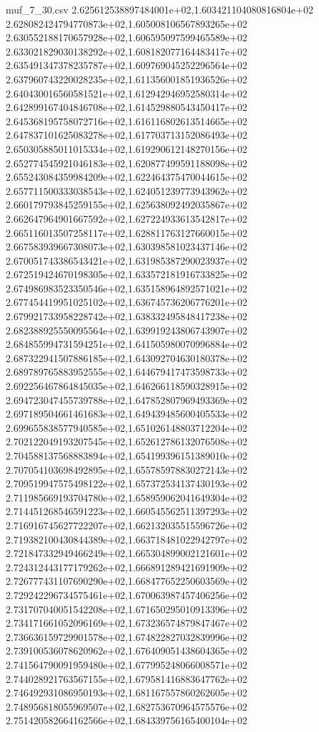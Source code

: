 \begin{filecontents*}{muf_7_30.csv}
2.625612538897484001e+02,1.603421104080816804e+02
2.628082424794770873e+02,1.605008106567893265e+02
2.630552188170657928e+02,1.606595097599465589e+02
2.633021829030138292e+02,1.608182077164483417e+02
2.635491347378235787e+02,1.609769045252296564e+02
2.637960743220028235e+02,1.611356001851936526e+02
2.640430016560581521e+02,1.612942946952580314e+02
2.642899167404846708e+02,1.614529880543450417e+02
2.645368195758072716e+02,1.616116802613514665e+02
2.647837101625083278e+02,1.617703713152086493e+02
2.650305885011015334e+02,1.619290612148270156e+02
2.652774545921046183e+02,1.620877499591188098e+02
2.655243084359984209e+02,1.622464375470044615e+02
2.657711500333038543e+02,1.624051239773943962e+02
2.660179793845259155e+02,1.625638092492035867e+02
2.662647964901667592e+02,1.627224933613542817e+02
2.665116013507258117e+02,1.628811763127660015e+02
2.667583939667308073e+02,1.630398581023437146e+02
2.670051743386543421e+02,1.631985387290023937e+02
2.672519424670198305e+02,1.633572181916733825e+02
2.674986983523350546e+02,1.635158964892571021e+02
2.677454419951025102e+02,1.636745736206776201e+02
2.679921733958228742e+02,1.638332495848417238e+02
2.682388925550095564e+02,1.639919243806743907e+02
2.684855994731594251e+02,1.641505980070996884e+02
2.687322941507886185e+02,1.643092704630180378e+02
2.689789765883952555e+02,1.644679417473598733e+02
2.692256467864845035e+02,1.646266118590328915e+02
2.694723047455739788e+02,1.647852807969493369e+02
2.697189504661461683e+02,1.649439485600405533e+02
2.699655838577940585e+02,1.651026148803712204e+02
2.702122049193207545e+02,1.652612786132076508e+02
2.704588137568883894e+02,1.654199396151389010e+02
2.707054103698492895e+02,1.655785978830272143e+02
2.709519947575498122e+02,1.657372534137430193e+02
2.711985669193704780e+02,1.658959062041649304e+02
2.714451268546591223e+02,1.660545562511397293e+02
2.716916745627722207e+02,1.662132035515596726e+02
2.719382100430844389e+02,1.663718481022942797e+02
2.721847332949466249e+02,1.665304899002121601e+02
2.724312443177179262e+02,1.666891289421691909e+02
2.726777431107690290e+02,1.668477652250603569e+02
2.729242296734575461e+02,1.670063987457406256e+02
2.731707040051542208e+02,1.671650295010913396e+02
2.734171661052096169e+02,1.673236574879847467e+02
2.736636159729901578e+02,1.674822827032839996e+02
2.739100536078620962e+02,1.676409051438604365e+02
2.741564790091959480e+02,1.677995248066008571e+02
2.744028921763567155e+02,1.679581416883647762e+02
2.746492931086950193e+02,1.681167557860262605e+02
2.748956818055969507e+02,1.682753670964575576e+02
2.751420582664162566e+02,1.684339756165400104e+02

\end{filecontents*}
